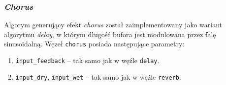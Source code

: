 \subsubsection{\textit{Chorus}}

Algorym generujący efekt \textit{chorus} został zaimplementowany jako wariant algorytmu \textit{delay},
w którym długość bufora jest modulowana przez falę sinusoidalną. Węzeł \texttt{chorus}
posiada następujące parametry:

\begin{enumerate}
  \item \texttt{input\_feedback} -- tak samo jak w węźle \texttt{delay}.
  \item \texttt{input\_dry}, \texttt{input\_wet} -- tak samo jak w węźle \texttt{reverb}.
\end{enumerate}


